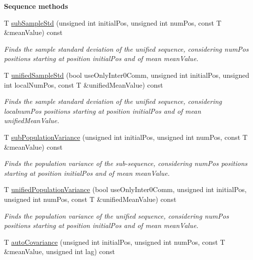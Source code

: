\begin{Indent}{\bf Sequence methods}
\begin{DoxyCompactItemize}
T \hyperlink{class_q_u_e_s_o_1_1_scalar_sequence_a602553eda9cecc0bd1cdaf7d6616be9f}{sub\-Sample\-Std} (unsigned int initial\-Pos, unsigned int num\-Pos, const T \&mean\-Value) const 
\begin{DoxyCompactList}\small\item\em Finds the sample standard deviation of the unified sequence, considering {\ttfamily num\-Pos} positions starting at position {\ttfamily initial\-Pos} and of mean {\ttfamily mean\-Value}. \end{DoxyCompactList}\item 
T \hyperlink{class_q_u_e_s_o_1_1_scalar_sequence_a7eebeb697f3da4e4650334c120526e80}{unified\-Sample\-Std} (bool use\-Only\-Inter0\-Comm, unsigned int initial\-Pos, unsigned int local\-Num\-Pos, const T \&unified\-Mean\-Value) const 
\begin{DoxyCompactList}\small\item\em Finds the sample standard deviation of the unified sequence, considering {\ttfamily localnum\-Pos} positions starting at position {\ttfamily initial\-Pos} and of mean {\ttfamily unified\-Mean\-Value}. \end{DoxyCompactList}\item 
T \hyperlink{class_q_u_e_s_o_1_1_scalar_sequence_a997bf4ce6fc322d71c509f8d622ad538}{sub\-Population\-Variance} (unsigned int initial\-Pos, unsigned int num\-Pos, const T \&mean\-Value) const 
\begin{DoxyCompactList}\small\item\em Finds the population variance of the sub-\/sequence, considering {\ttfamily num\-Pos} positions starting at position {\ttfamily initial\-Pos} and of mean {\ttfamily mean\-Value}. \end{DoxyCompactList}\item 
T \hyperlink{class_q_u_e_s_o_1_1_scalar_sequence_a268e170c975200b6f96068f892982fe9}{unified\-Population\-Variance} (bool use\-Only\-Inter0\-Comm, unsigned int initial\-Pos, unsigned int num\-Pos, const T \&unified\-Mean\-Value) const 
\begin{DoxyCompactList}\small\item\em Finds the population variance of the unified sequence, considering {\ttfamily num\-Pos} positions starting at position {\ttfamily initial\-Pos} and of mean {\ttfamily mean\-Value}. \end{DoxyCompactList}\item 
T \hyperlink{class_q_u_e_s_o_1_1_scalar_sequence_ae923359502fc1caf5802cd42d5ad646a}{auto\-Covariance} (unsigned int initial\-Pos, unsigned int num\-Pos, const T \&mean\-Value, unsigned int lag) const 

\end{DoxyCompactItemize}
\end{Indent}
